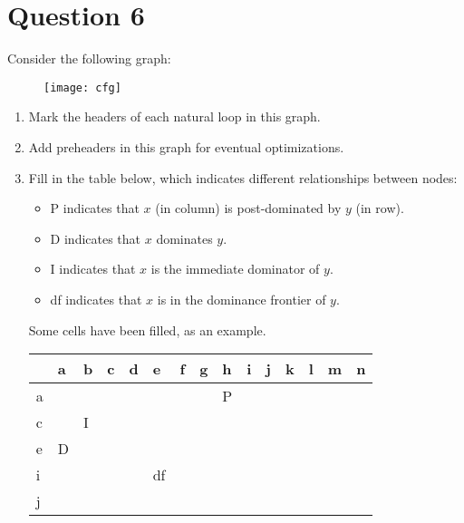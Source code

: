 \documentclass{report}
\begin{document}
\section*{Question 6}
Consider the following graph:
\begin{figure}[ht]
    \centering
    \texttt{[image: cfg]}
\end{figure}
\begin{enumerate}
    \item Mark the headers of each natural loop in this graph.
    \item Add preheaders in this graph for eventual optimizations.
    \item Fill in the table below, which indicates different relationships between nodes:
    \begin{itemize}
        \item[] P indicates that $x$ (in column) is post-dominated by $y$ (in row).
        \item[] D indicates that $x$ dominates $y$.
        \item[] I indicates that $x$ is the immediate dominator of $y$.
        \item[] df indicates that $x$ is in the dominance frontier of $y$. 
    \end{itemize}
    Some cells have been filled, as an example.

    \begin{table}[ht]
        \centering
        \begin{tabular}{| l || l  | l  | l  | l  | l  | l  | l  | l  | l  | l  | l  | l  | l  | l |}
            \hline
              & a & b & c & d & e & f & g & h & i & j & k & l & m & n \\
            \hline
            a &   &   &   &   &   &   &   & P &   &   &   &   &   &   \\
            \hline
            c &   & I  &   &   &   &   &   &   &   &   &   &   &   &   \\
            \hline
            e & D  &   &   &   &   &   &   &   &   &   &   &   &   &   \\
            \hline
            i &   &   &   &   & df  &   &   &   &   &   &   &   &   &   \\
            \hline
            j &   &   &   &   &   &   &   &   &   &   &   &   &   &   \\
            \hline
        \end{tabular}
    \end{table}
\end{enumerate}
\end{document}
